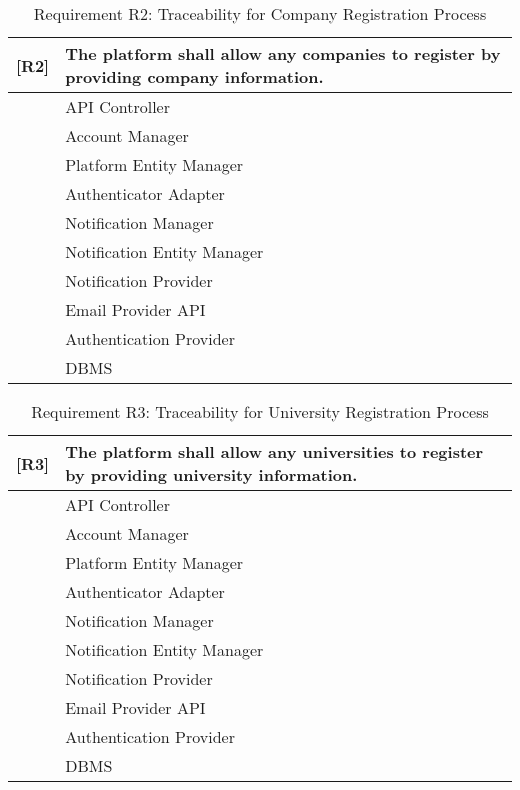 \begin{table}[H]
    \centering
    \begin{tabular}{|p{1cm}|p{14cm}|}
    \hline
    \textbf{[R2]} & \textbf{The platform shall allow any companies to register by providing company information.} \\ \hline
    [C1] & API Controller \\ \hline
    [C2] & Account Manager \\ \hline
    [C10] & Platform Entity Manager \\ \hline
    [C11] & Authenticator Adapter \\ \hline
    [C12] & Notification Manager \\ \hline
    [C13] & Notification Entity Manager \\ \hline
    [E1] & Notification Provider \\ \hline
    [E2] & Email Provider API \\ \hline
    [E3] & Authentication Provider \\ \hline
    [E4] & DBMS \\ \hline
    \end{tabular}
    \caption{Requirement R2: Traceability for Company Registration Process}
    \label{tab:RT2}
\end{table}

\begin{table}[H]
    \centering
    \begin{tabular}{|p{1cm}|p{14cm}|}
    \hline
    \textbf{[R3]} & \textbf{The platform shall allow any universities to register by providing university information.} \\ \hline
    [C1] & API Controller \\ \hline
    [C2] & Account Manager \\ \hline
    [C10] & Platform Entity Manager \\ \hline
    [C11] & Authenticator Adapter \\ \hline
    [C12] & Notification Manager \\ \hline
    [C13] & Notification Entity Manager \\ \hline
    [E1] & Notification Provider \\ \hline
    [E2] & Email Provider API \\ \hline
    [E3] & Authentication Provider \\ \hline
    [E4] & DBMS \\ \hline
    \end{tabular}
    \caption{Requirement R3: Traceability for University Registration Process}
    \label{tab:RT3}
\end{table}

